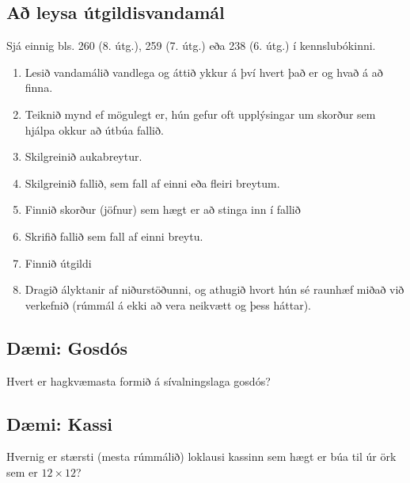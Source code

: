 \documentclass[a4paper,10pt,icelandic]{sphinxmanual}
\begin{document}
\subsection{Að leysa útgildisvandamál}
\label{kafli05:a-leysa-utgildisvandamal}
Sjá einnig bls. 260 (8. útg.), 259 (7. útg.) eða 238 (6. útg.) í kennslubókinni.
\begin{enumerate}
\item {} 
Lesið vandamálið vandlega og áttið ykkur á því hvert það er og
hvað á að finna.

\item {} 
Teiknið mynd ef mögulegt er, hún gefur oft upplýsingar um skorður
sem hjálpa okkur að útbúa fallið.

\item {} 
Skilgreinið aukabreytur.

\item {} 
Skilgreinið fallið, sem fall af einni eða fleiri breytum.

\item {} 
Finnið skorður (jöfnur) sem hægt er að stinga inn í fallið

\item {} 
Skrifið fallið sem fall af einni breytu.

\item {} 
Finnið útgildi

\item {} 
Dragið ályktanir af niðurstöðunni, og athugið hvort hún sé
raunhæf miðað við verkefnið (rúmmál á ekki að vera neikvætt og
þess háttar).

\end{enumerate}


\subsection{Dæmi: Gosdós}
\label{kafli05:daemi-gosdos}
Hvert er hagkvæmasta formið á sívalningslaga gosdós?



\subsection{Dæmi: Kassi}
\label{kafli05:daemi-kassi}
Hvernig er stærsti (mesta rúmmálið) loklausi kassinn sem hægt er búa til úr
örk sem er \(12 \times 12\)?
\end{document}
